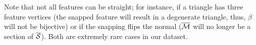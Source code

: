 Note that not all features can be {straight}; for instance, if a triangle has three feature vertices (the snapped feature will result {in} a degenerate triangle, thus, $\beta$ will not be bijective) or if the snapping flips the normal ($\overline{\mathcal{M}}$ will no longer be a section of $\overline{\mathcal{S}}$). Both are extremely rare cases in our dataset.


